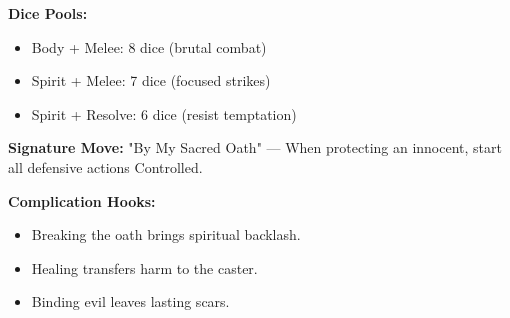 \textbf{Dice Pools:}
\begin{itemize}
  \item Body + Melee: 8 dice (brutal combat)
  \item Spirit + Melee: 7 dice (focused strikes)
  \item Spirit + Resolve: 6 dice (resist temptation)
\end{itemize}

\textbf{Signature Move:} "By My Sacred Oath" — When protecting an innocent, start all defensive actions Controlled.

\textbf{Complication Hooks:}
\begin{itemize}
  \item Breaking the oath brings spiritual backlash.
  \item Healing transfers harm to the caster.
  \item Binding evil leaves lasting scars.
\end{itemize}

